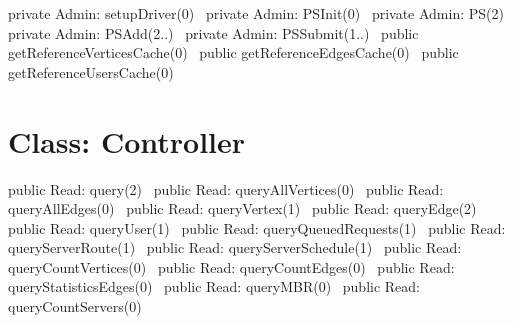 private \LA{}Admin: setupDriver(0)~{\nwtagstyle{}}\RA{}
private \LA{}Admin: PSInit(0)~{\nwtagstyle{}}\RA{}
private \LA{}Admin: PS(2)~{\nwtagstyle{}}\RA{}
private \LA{}Admin: PSAdd(2..)~{\nwtagstyle{}}\RA{}
private \LA{}Admin: PSSubmit(1..)~{\nwtagstyle{}}\RA{}
public \LA{}getReferenceVerticesCache(0)~{\nwtagstyle{}}\RA{}
public \LA{}getReferenceEdgesCache(0)~{\nwtagstyle{}}\RA{}
public \LA{}getReferenceUsersCache(0)~{\nwtagstyle{}}\RA{}
\nwendcode{}\nwdocspar

\section*{Class: Controller}
\nwenddocs{}\endmoddef{}
public \LA{}Read: query(2)~{\nwtagstyle{}}\RA{}
public \LA{}Read: queryAllVertices(0)~{\nwtagstyle{}}\RA{}
public \LA{}Read: queryAllEdges(0)~{\nwtagstyle{}}\RA{}
public \LA{}Read: queryVertex(1)~{\nwtagstyle{}}\RA{}
public \LA{}Read: queryEdge(2)~{\nwtagstyle{}}\RA{}
public \LA{}Read: queryUser(1)~{\nwtagstyle{}}\RA{}
public \LA{}Read: queryQueuedRequests(1)~{\nwtagstyle{}}\RA{}
public \LA{}Read: queryServerRoute(1)~{\nwtagstyle{}}\RA{}
public \LA{}Read: queryServerSchedule(1)~{\nwtagstyle{}}\RA{}
public \LA{}Read: queryCountVertices(0)~{\nwtagstyle{}}\RA{}
public \LA{}Read: queryCountEdges(0)~{\nwtagstyle{}}\RA{}
public \LA{}Read: queryStatisticsEdges(0)~{\nwtagstyle{}}\RA{}
public \LA{}Read: queryMBR(0)~{\nwtagstyle{}}\RA{}
public \LA{}Read: queryCountServers(0)~{\nwtagstyle{}}\RA{}
